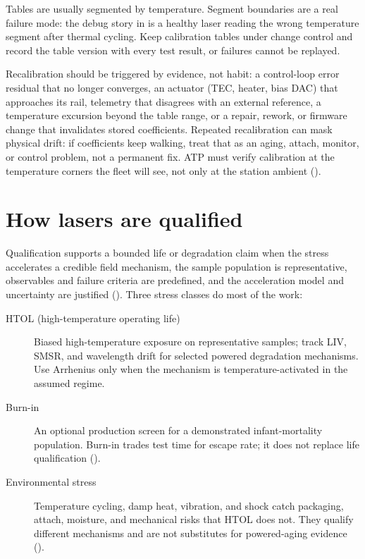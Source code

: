 Tables are usually segmented by temperature. Segment boundaries are a real
failure mode: the debug story in  is a healthy
laser reading the wrong temperature segment after thermal cycling. Keep
calibration tables under change control and record the table version with every
test result, or failures cannot be replayed.

Recalibration should be triggered by evidence, not habit: a control-loop error
residual that no longer converges, an actuator (TEC, heater, bias DAC) that
approaches its rail, telemetry that disagrees with an external reference, a
temperature excursion beyond the table range, or a repair, rework, or firmware
change that invalidates stored coefficients. Repeated recalibration can mask
physical drift: if coefficients keep walking, treat that as an aging, attach,
monitor, or control problem, not a permanent fix. ATP must verify calibration
at the temperature corners the fleet will see, not only at the station ambient
().

\section{How lasers are qualified}
\label{sec:how-lasers-qualified}

Qualification supports a bounded life or degradation claim when the stress
accelerates a credible field mechanism, the sample population is representative,
observables and failure criteria are predefined, and the acceleration model and
uncertainty are justified (). Three stress classes
do most of the work:

\begin{description}
\item[HTOL (high-temperature operating life)] Biased high-temperature exposure on
      representative samples; track LIV, SMSR, and wavelength drift for selected
      powered degradation mechanisms. Use Arrhenius only when the mechanism is
      temperature-activated in the assumed regime.
\item[Burn-in] An optional production screen for a demonstrated infant-mortality
      population. Burn-in trades test time for escape rate; it does not replace
      life qualification ().
\item[Environmental stress] Temperature cycling, damp heat, vibration, and shock
      catch packaging, attach, moisture, and mechanical risks that HTOL does not.
      They qualify different mechanisms and are not substitutes for powered-aging
      evidence ().
\end{description}

